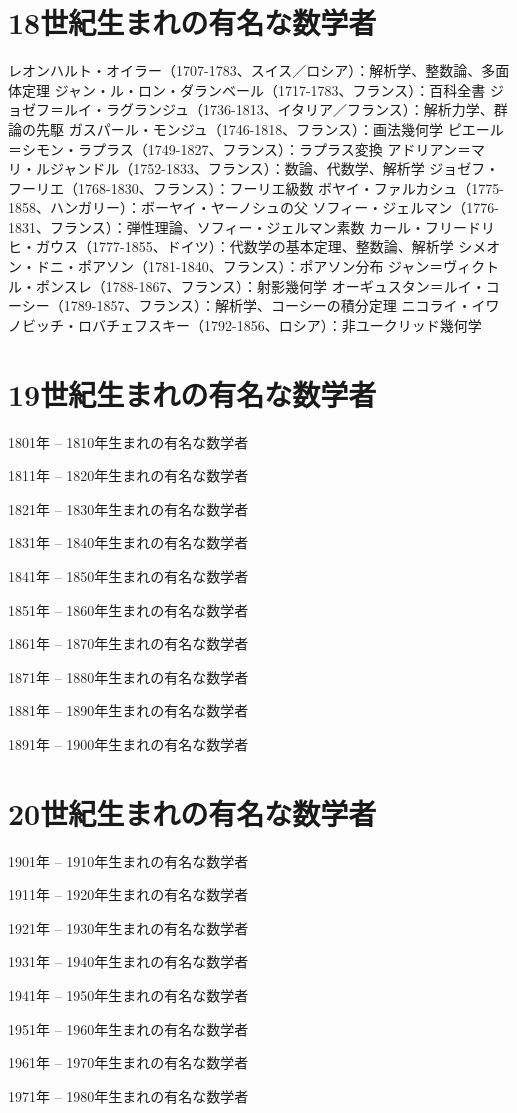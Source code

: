\documentclass[a4paper,12pt]{jsarticle}
\theoremstyle{plain}
\theoremstyle{remark}  %
\theoremstyle{definition}  %
\begin{document}
\section{18世紀生まれの有名な数学者}
    レオンハルト・オイラー（1707-1783、スイス／ロシア）：解析学、整数論、多面体定理
    ジャン・ル・ロン・ダランベール（1717-1783、フランス）：百科全書
    ジョゼフ＝ルイ・ラグランジュ（1736-1813、イタリア／フランス）：解析力学、群論の先駆
    ガスパール・モンジュ（1746-1818、フランス）：画法幾何学
    ピエール＝シモン・ラプラス（1749-1827、フランス）：ラプラス変換
    アドリアン＝マリ・ルジャンドル（1752-1833、フランス）：数論、代数学、解析学
    ジョゼフ・フーリエ（1768-1830、フランス）：フーリエ級数
    ボヤイ・ファルカシュ（1775-1858、ハンガリー）：ボーヤイ・ヤーノシュの父
    ソフィー・ジェルマン（1776-1831、フランス）：弾性理論、ソフィー・ジェルマン素数
    カール・フリードリヒ・ガウス（1777-1855、ドイツ）：代数学の基本定理、整数論、解析学
    シメオン・ドニ・ポアソン（1781-1840、フランス）：ポアソン分布
    ジャン＝ヴィクトル・ポンスレ（1788-1867、フランス）：射影幾何学
    オーギュスタン＝ルイ・コーシー（1789-1857、フランス）：解析学、コーシーの積分定理
    ニコライ・イワノビッチ・ロバチェフスキー（1792-1856、ロシア）：非ユークリッド幾何学
\section{19世紀生まれの有名な数学者}
1801年 -- 1810年生まれの有名な数学者

1811年 -- 1820年生まれの有名な数学者

1821年 -- 1830年生まれの有名な数学者

1831年 -- 1840年生まれの有名な数学者

1841年 -- 1850年生まれの有名な数学者

1851年 -- 1860年生まれの有名な数学者

1861年 -- 1870年生まれの有名な数学者

1871年 -- 1880年生まれの有名な数学者

1881年 -- 1890年生まれの有名な数学者

1891年 -- 1900年生まれの有名な数学者

\section{20世紀生まれの有名な数学者}
1901年 -- 1910年生まれの有名な数学者

1911年 -- 1920年生まれの有名な数学者

1921年 -- 1930年生まれの有名な数学者

1931年 -- 1940年生まれの有名な数学者

1941年 -- 1950年生まれの有名な数学者

1951年 -- 1960年生まれの有名な数学者

1961年 -- 1970年生まれの有名な数学者

1971年 -- 1980年生まれの有名な数学者




\end{document}
